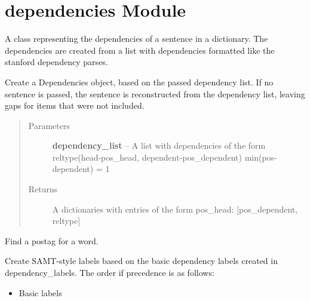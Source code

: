 \documentclass[letterpaper,10pt,english]{sphinxmanual}
\begin{document}
\chapter{dependencies Module}
\label{dependencies:dependencies-module}\label{dependencies::doc}\label{dependencies:module-dependencies}

\begin{fulllineitems}
\label{dependencies:dependencies.Dependencies}
A class representing the dependencies of a sentence in a dictionary.
The dependencies are created from a list with dependencies formatted
like the stanford dependency parses.

Create a Dependencies object, based on the passed dependency list.
If no sentence is passed, the sentence is reconstructed from the
dependency list, leaving gaps for items that were not included.
\begin{quote}\begin{description}
\item[{Parameters}] \leavevmode
\textbf{dependency\_list} -- A list with dependencies of the form 
reltype(head-pos\_head, dependent-pos\_dependent)
min(pos-dependent) = 1

\item[{Returns}] \leavevmode
A dictionaries with entries of the form pos\_head: {[}pos\_dependent, reltype{]}

\end{description}\end{quote}

\begin{fulllineitems}
\label{dependencies:dependencies.Dependencies.POStag}
Find a postag for a word.

\end{fulllineitems}


\begin{fulllineitems}
\label{dependencies:dependencies.Dependencies.SAMT_labels}
Create SAMT-style labels based on the basic dependency labels
created in dependency\_labels. The order if precedence is as follows:
\begin{itemize}
\item {} 
Basic labels


\end{itemize}
\end{fulllineitems}
\end{fulllineitems}
\end{document}

